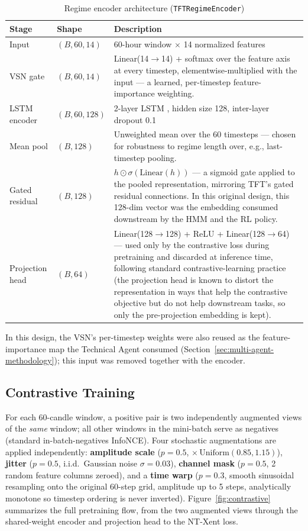 \begin{table}[H]
\centering
\caption{Regime encoder architecture (\texttt{TFTRegimeEncoder})}
\label{tab:encoder-arch}
\begin{tabular}{|l|l|p{6.3cm}|}
\hline
\textbf{Stage} & \textbf{Shape} & \textbf{Description} \\
\hline
Input & $(B, 60, 14)$ & 60-hour window $\times$ 14 normalized features \\
\hline
VSN gate & $(B, 60, 14)$ & Linear(14$\to$14) + softmax over the feature axis at every timestep, elementwise-multiplied with the input --- a learned, per-timestep feature-importance weighting. \\
\hline
LSTM encoder & $(B, 60, 128)$ & 2-layer LSTM \cite{lstm1997}, hidden size 128, inter-layer dropout 0.1 \\
\hline
Mean pool & $(B, 128)$ & Unweighted mean over the 60 timesteps --- chosen for robustness to regime length over, e.g., last-timestep pooling. \\
\hline
Gated residual & $(B, 128)$ & $h \odot \sigma(\mathrm{Linear}(h))$ --- a sigmoid gate applied to the pooled representation, mirroring TFT's gated residual connections. In this original design, this 128-dim vector was the embedding consumed downstream by the HMM and the RL policy. \\
\hline
Projection head & $(B, 64)$ & Linear(128$\to$128) + ReLU + Linear(128$\to$64) --- used only by the contrastive loss during pretraining and discarded at inference time, following standard contrastive-learning practice (the projection head is known to distort the representation in ways that help the contrastive objective but do not help downstream tasks, so only the pre-projection embedding is kept). \\
\hline
\end{tabular}
\end{table}

In this design, the VSN's per-timestep weights were also reused as the feature-importance map the Technical Agent consumed (Section~\ref{sec:multi-agent-methodology}); this input was removed together with the encoder.

\subsection{Contrastive Training}
\label{subsec:encoder-training}

For each 60-candle window, a positive pair is two independently augmented views of the \emph{same} window; all other windows in the mini-batch serve as negatives (standard in-batch-negatives InfoNCE). Four stochastic augmentations are applied independently: \textbf{amplitude scale} ($p=0.5$, $\times\,\mathrm{Uniform}(0.85,1.15)$), \textbf{jitter} ($p=0.5$, i.i.d.\ Gaussian noise $\sigma=0.03$), \textbf{channel mask} ($p=0.5$, 2 random feature columns zeroed), and a \textbf{time warp} ($p=0.3$, smooth sinusoidal resampling onto the original 60-step grid, amplitude up to 5 steps, analytically monotone so timestep ordering is never inverted). Figure~\ref{fig:contrastive} summarizes the full pretraining flow, from the two augmented views through the shared-weight encoder and projection head to the NT-Xent loss.

